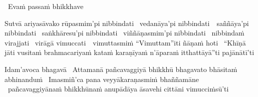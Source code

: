 \begin{pali-leader}
  \anglebracketleft\ \hspace{-0.5mm}Evaṁ passaṁ bhikkhave \hspace{-0.5mm}\anglebracketright\
\end{pali-leader}
\begin{pali-hangtogether}
  Sutvā ariyasāvako rūpasmim'pi nibbindati \breathmark\ vedanāya'pi \mbox{nibbindati}~\breathmark\ saññāya'pi nibbindati \breathmark\ saṅkhāresu'pi nibbindati \breathmark\ viññāṇasmim'pi nibbindati \breathmark\ nibbindaṁ virajjati \breathmark\ virāgā \mbox{vimuccati}~\breathmark\ vimuttasmiṁ ``Vimuttam''iti ñāṇaṁ hoti \breathmark\ ``Khīṇā jāti vusitaṁ brahmacariyaṁ kataṁ karaṇīyaṁ n'āparaṁ itthattāyā''ti pajānātī'ti
\end{pali-hangtogether}

\clearpage

\begin{pali-hang}
  Idam'avoca bhagavā \breathmark\ Attamanā pañcavaggiyā bhikkhū bhagavato bhāsitaṁ abhinanduṁ \breathmark\ Imasmiñ'ca pana veyyākaraṇasmiṁ bhaññamāne \breathmark\ pañcavaggiyānaṁ bhikkhūnaṁ anupādāya āsavehi cittāni vimucciṁsū'ti
\end{pali-hang}

\suttaRef{[SN 22.59]}

